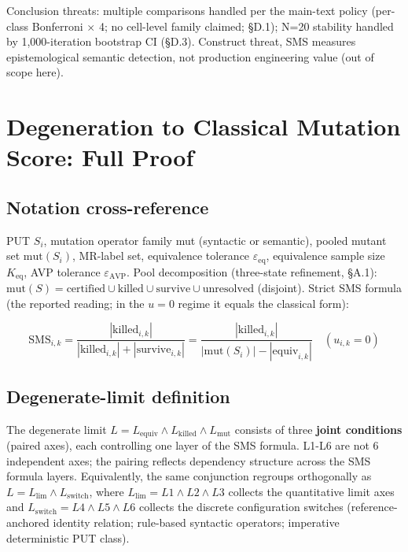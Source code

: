 \documentclass[review,12pt,authoryear]{elsarticle}
\begin{document}
Conclusion threats: multiple comparisons handled per the main-text
policy (per-class Bonferroni $\times$ 4; no cell-level family claimed;
§D.1); N=20 stability handled by 1,000-iteration
bootstrap CI (§D.3). Construct threat, SMS measures epistemological
semantic detection, not production engineering value (out of scope here).


\section{Degeneration to Classical Mutation Score: Full Proof}\label{g.-sms-ms-degeneration-theorem-full-proof}

\subsection{Notation cross-reference}\label{g.1-notation-cross-reference-with-2.1}

PUT $S_i$, mutation operator family mut (syntactic or semantic),
pooled mutant set $\mathrm{mut}(S_i)$, MR-label set, equivalence tolerance $\varepsilon_{\mathrm{eq}}$, equivalence
sample size $K_{\mathrm{eq}}$, AVP tolerance $\varepsilon_{\mathrm{AVP}}$. Pool
decomposition (three-state refinement, §A.1):
$\mathrm{mut}(S) = \mathrm{certified} \cup \mathrm{killed} \cup \mathrm{survive} \cup \mathrm{unresolved}$
(disjoint). Strict SMS formula (the reported reading; in the
$u = 0$ regime it equals the classical form):

\[
\mathrm{SMS}_{i,k} = \frac{|\mathrm{killed}_{i,k}|}{|\mathrm{killed}_{i,k}| + |\mathrm{survive}_{i,k}|}
= \frac{|\mathrm{killed}_{i,k}|}{|\mathrm{mut}(S_i)| - |\mathrm{equiv}_{i,k}|} \quad (u_{i,k} = 0)
\]

\subsection{Degenerate-limit definition}\label{g.2-degenerate-limit-definition-r-8-p1-3-revision-3-joint-conditions}

The degenerate limit $L = L_{\mathrm{equiv}} \wedge L_{\mathrm{killed}} \wedge L_{\mathrm{mut}}$
consists of three \textbf{joint conditions} (paired axes), each
controlling one layer of the SMS formula. L1-L6 are not 6 independent
axes; the pairing reflects dependency structure across the SMS formula
layers. Equivalently, the same conjunction regroups orthogonally as
$L = L_{\mathrm{lim}} \wedge L_{\mathrm{switch}}$, where
$L_{\mathrm{lim}} = L1 \wedge L2 \wedge L3$ collects the quantitative
limit axes and $L_{\mathrm{switch}} = L4 \wedge L5 \wedge L6$ collects
the discrete configuration switches (reference-anchored identity
relation; rule-based syntactic operators; imperative deterministic PUT
class).
\end{document}

